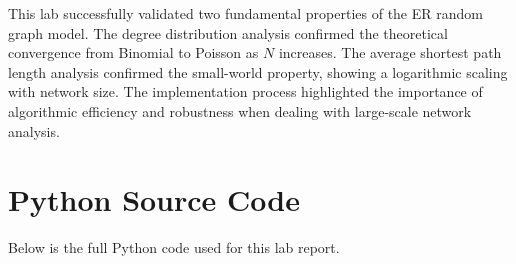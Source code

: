 \documentclass[11pt,a4paper]{article} %
\begin{document}
This lab successfully validated two fundamental properties of the ER random graph model. The degree distribution analysis confirmed the theoretical convergence from Binomial to Poisson as $N$ increases. The average shortest path length analysis confirmed the small-world property, showing a logarithmic scaling with network size. The implementation process highlighted the importance of algorithmic efficiency and robustness when dealing with large-scale network analysis.


\section{Python Source Code}  

\vspace{0.5em}  
Below is the full Python code used for this lab report.  
\end{document}
